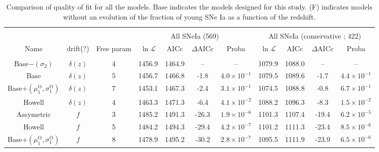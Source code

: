 \documentclass[]{aa} %
\begin{document}
\begin{table}
    \centering
    \caption{Comparison of quality of fit for all the models. Base indicates the
    models designed for this study. (F) indicates models without an evolution of
the fraction of young SNe Ia as a function of the redshift.}
    \label{tab:comp}
    \begin{tabular}{c c c  c c c c  c c c c}\hline\hline\\[-0.8em]
        & & & \multicolumn{4}{c}{All SNeIa (569)} &
        \multicolumn{4}{c}{All SNeIa (conservative ; 422)} \\
        Name & drift(?) & Free param &
        $\ln\mathcal{L}$ & $\mathrm{AICc}$ & $\Delta \mathrm{AICc}$ & Proba &
        $\ln\mathcal{L}$ & $\mathrm{AICc}$ & $\Delta \mathrm{AICc}$ & Proba \\
        [0.15em]\hline\\[-0.8em]

        Base$-(\sigma_2)$ & $\delta(z)$ & 4
        & 1456.9 & 1464.9 & -- &  --
        & 1079.9 & 1088.0 & -- & -- \\[0.15em]

        Base & $\delta(z)$ & 5
        & 1456.7  & 1466.8 & -1.8 & $4.0\times10^{-1}$
        & 1079.5 & 1089.6 & -1.7 & $4.4\times10^{-1}$\\[0.15em]

        Base$+(\mu_1^{\mathrm{O}}, \sigma_1^{\mathrm{O}})$ & $\delta(z)$ & 7
        & 1453.1  & 1467.3 & -2.4 & $3.1\times10^{-1}$
        & 1074.5 & 1088.8 & -0.8 & $6.7\times10^{-1}$\\[0.15em]

        Howell & $\delta(z)$ & 4
        & 1463.3 & 1471.3 & -6.4 & $4.1\times10^{-2}$
        & 1088.2 & 1096.3 & -8.3 & $1.5\times10^{-2}$\\[0.15em]

        Assymetric & $f$ & 3
        & 1485.2 & 1491.3 & -26.3 & $1.9\times10^{-6}$
        & 1101.3 & 1107.4 & -19.4 & $6.2\times10^{-5}$\\[0.15em]

        Howell & $f$ & 5
        & 1484.2 & 1494.3 & -29.4 & $4.2\times10^{-7}$
        & 1101.2 & 1111.3 & -23.4 & $8.5\times10^{-6}$\\[0.15em]
        
        Base$+(\mu_1^{\mathrm{O}}, \sigma_1^{\mathrm{O}})$ & $f$ & 8
        & 1478.9 & 1495.2 & -30.2 & $2.8\times10^{-7}$
        & 1095.5 & 1111.9 & -23.9 & $6.5\times10^{-6}$\\[0.15em]


\end{tabular}
\end{table}
\end{document}
